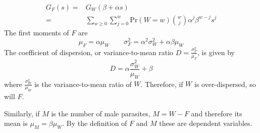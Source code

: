 \documentclass[12pt,a4paper]{article}
\theoremstyle{plain}%
\theoremstyle{definition}
\theoremstyle{remark}
\begin{document}
%	 
	\begin{equation}\label{genf}
	\begin{split}
	G_F(s)=&G_W(\beta + \alpha s)\\
	=&\sum_{w\geq 0}\sum_{j=0}^{w} \mathrm{Pr}(W=w)\binom{w}{j}\alpha^j\beta^{w-j}s^j
	\end{split}
	\end{equation}
	The first moments of $F$ are
	\begin{equation}
	\mu_F=\alpha \mu_W \qquad \sigma_F^2=\alpha^2\sigma_W^2+ \alpha\beta\mu_W
	\end{equation}
	The coefficient of dispersion, or variance-to-mean ratio 
	$D=\frac{\sigma_F^2}{\mu_F}$, is given by \[D=\alpha\frac{\sigma_W^2}{\mu_W}+\beta\]
	where $\frac{\sigma_W^2}{\mu_W}$ 
	is the variance-to-mean ratio of $W$.
	Therefore, if $W$ is over-dispersed, so will $F$. 
	
	
	Similarly, if $M$ is the number of male parasites,  $M = W - F$ and therefore its mean is $\mu_M=\beta\mu_W$. By the definition of $F$ and $M$ these are dependent variables.
	
\end{document}
